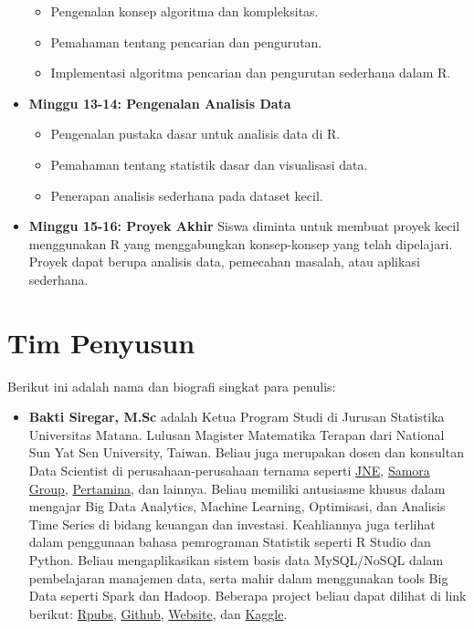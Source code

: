 \documentclass[
]{book}
\providecommand{\tightlist}{%
  \setlength{\itemsep}{0pt}\setlength{\parskip}{0pt}}
\begin{document}
\begin{itemize}
  \begin{itemize}
  \tightlist
  \item
    Pengenalan konsep algoritma dan kompleksitas.
  \item
    Pemahaman tentang pencarian dan pengurutan.
  \item
    Implementasi algoritma pencarian dan pengurutan sederhana dalam R.
  \end{itemize}
\item
  \textbf{Minggu 13-14: Pengenalan Analisis Data}

  \begin{itemize}
  \tightlist
  \item
    Pengenalan pustaka dasar untuk analisis data di R.
  \item
    Pemahaman tentang statistik dasar dan visualisasi data.
  \item
    Penerapan analisis sederhana pada dataset kecil.
  \end{itemize}
\item
  \textbf{Minggu 15-16: Proyek Akhir}
  Siswa diminta untuk membuat proyek kecil menggunakan R yang menggabungkan konsep-konsep yang telah dipelajari. Proyek dapat berupa analisis data, pemecahan masalah, atau aplikasi sederhana.
\end{itemize}

\hypertarget{tim-penyusun}{%
\section*{Tim Penyusun}\label{tim-penyusun}}

Berikut ini adalah nama dan biografi singkat para penulis:

\begin{itemize}
\tightlist
\item
  \textbf{Bakti Siregar, M.Sc} adalah Ketua Program Studi di Jurusan Statistika Universitas Matana. Lulusan Magister Matematika Terapan dari National Sun Yat Sen University, Taiwan. Beliau juga merupakan dosen dan konsultan Data Scientist di perusahaan-perusahaan ternama seperti \href{https://www.jne.co.id/id/beranda}{JNE}, \href{https://www.samoragroup.co.id/home/en}{Samora Group}, \href{https://www.pertamina.com/}{Pertamina}, dan lainnya. Beliau memiliki antusiasme khusus dalam mengajar Big Data Analytics, Machine Learning, Optimisasi, dan Analisis Time Series di bidang keuangan dan investasi. Keahliannya juga terlihat dalam penggunaan bahasa pemrograman Statistik seperti R Studio dan Python. Beliau mengaplikasikan sistem basis data MySQL/NoSQL dalam pembelajaran manajemen data, serta mahir dalam menggunakan tools Big Data seperti Spark dan Hadoop. Beberapa project beliau dapat dilihat di link berikut: \href{https://rpubs.com/dsciencelabs}{Rpubs}, \href{https://github.com/dsciencelabs}{Github}, \href{https://dsciencelabs.github.io/web/index.html}{Website}, dan \href{https://www.kaggle.com/baktisiregar/code}{Kaggle}.
\end{itemize}
\end{document}
